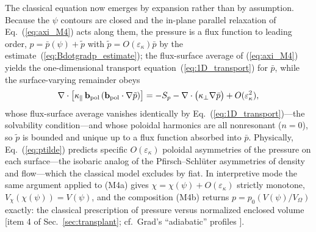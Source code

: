 \documentclass[english]{article}
\newcommand{\bb}{\mathbf{b}}
\begin{document}
The classical equation now emerges by expansion rather than by assumption. Because the $\psi$
contours are closed and the in-plane parallel relaxation of Eq.~(\ref{eq:axi_M4}) acts along them,
the pressure is a flux function to leading order, $p=\bar p(\psi)+\tilde p$ with
$\tilde p=O(\varepsilon_\kappa)\bar p$ by the estimate~(\ref{eq:Bdotgradp_estimate}); the
flux-surface average of (\ref{eq:axi_M4}) yields the one-dimensional transport
equation~(\ref{eq:1D_transport}) for $\bar p$, while the surface-varying remainder obeys
\begin{equation}
\nabla\cdot\big[\kappa_\parallel\,\bb_{\rm pol}\,(\bb_{\rm pol}\cdot\nabla\tilde p)\big]
=-S_p-\nabla\cdot\big(\kappa_\perp\nabla\bar p\big)+O(\varepsilon_\kappa^{2}) ,
\label{eq:ptilde}
\end{equation}
whose flux-surface average vanishes identically by Eq.~(\ref{eq:1D_transport})---the solvability
condition---and whose poloidal harmonics are all nonresonant ($n=0$), so $\tilde p$ is bounded and
unique up to a flux function absorbed into $\bar p$. Physically, Eq.~(\ref{eq:ptilde}) predicts
specific $O(\varepsilon_\kappa)$ poloidal asymmetries of the pressure on each surface---the
isobaric analog of the Pfirsch--Schl\"uter asymmetries of density and flow---which the classical
model excludes by fiat. In interpretive mode the same argument applied to (M4a) gives
$\chi=\chi(\psi)+O(\varepsilon_\kappa)$ strictly monotone, $V_\chi(\chi(\psi))=V(\psi)$, and the
composition (M4b) returns $p=p_0(V(\psi)/V_\Omega)$ exactly: the classical prescription of pressure versus
normalized enclosed volume [item 4 of Sec.~\ref{sec:transplant}; cf.\ Grad's ``adiabatic'' profiles
\cite{grad1975}].
\end{document}
